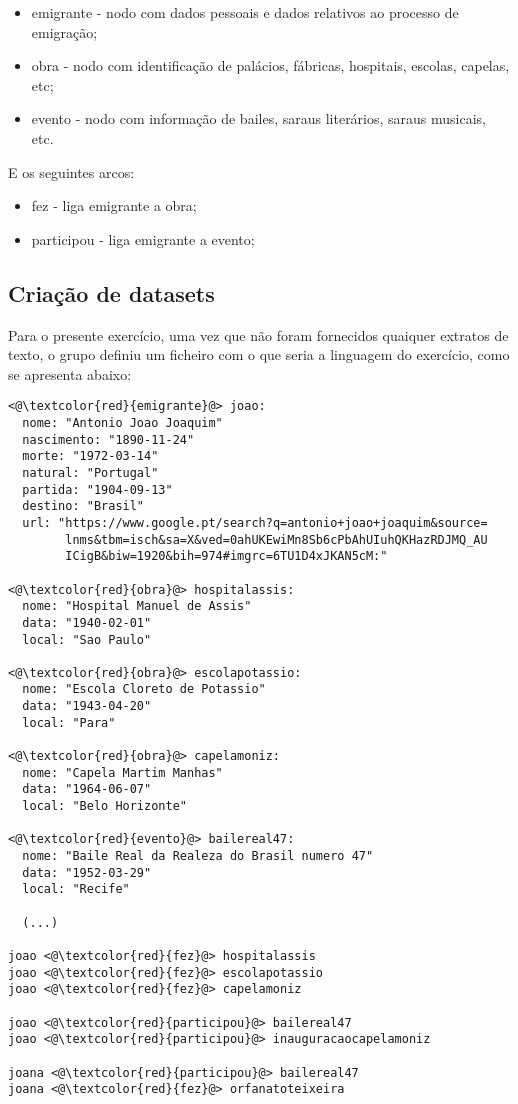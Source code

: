\documentclass[a4paper]{article}
\begin{document}
\begin{itemize}
    \item emigrante - nodo com dados pessoais e dados relativos ao
processo de emigração;
    \item obra - nodo com identificação de palácios, fábricas, hospitais, escolas, capelas, etc;
    \item evento - nodo com informação de bailes, saraus literários, saraus musicais, etc.
\end{itemize}

\bigskip
E os seguintes arcos:

\begin{itemize}
    \item fez - liga emigrante a obra;
    \item participou - liga emigrante a evento;
\end{itemize}

\pagebreak
\subsection{Criação de datasets}
\label{sec:3.1}
\hspace{3.5mm} Para o presente exercício, uma vez que não foram fornecidos quaiquer extratos de texto, o grupo definiu um ficheiro com o que seria a linguagem do exercício, como se apresenta abaixo:

\bigskip

\begin{lstlisting}
<@\textcolor{red}{emigrante}@> joao:
  nome: "Antonio Joao Joaquim"
  nascimento: "1890-11-24"
  morte: "1972-03-14"
  natural: "Portugal"
  partida: "1904-09-13"
  destino: "Brasil"
  url: "https://www.google.pt/search?q=antonio+joao+joaquim&source=
        lnms&tbm=isch&sa=X&ved=0ahUKEwiMn8Sb6cPbAhUIuhQKHazRDJMQ_AU
        ICigB&biw=1920&bih=974#imgrc=6TU1D4xJKAN5cM:"

<@\textcolor{red}{obra}@> hospitalassis:
  nome: "Hospital Manuel de Assis"
  data: "1940-02-01"
  local: "Sao Paulo"

<@\textcolor{red}{obra}@> escolapotassio:
  nome: "Escola Cloreto de Potassio"
  data: "1943-04-20"
  local: "Para"

<@\textcolor{red}{obra}@> capelamoniz:
  nome: "Capela Martim Manhas"
  data: "1964-06-07"
  local: "Belo Horizonte"

<@\textcolor{red}{evento}@> bailereal47:
  nome: "Baile Real da Realeza do Brasil numero 47"
  data: "1952-03-29"
  local: "Recife"
  
  (...)

joao <@\textcolor{red}{fez}@> hospitalassis
joao <@\textcolor{red}{fez}@> escolapotassio
joao <@\textcolor{red}{fez}@> capelamoniz

joao <@\textcolor{red}{participou}@> bailereal47
joao <@\textcolor{red}{participou}@> inauguracaocapelamoniz

joana <@\textcolor{red}{participou}@> bailereal47
joana <@\textcolor{red}{fez}@> orfanatoteixeira
\end{lstlisting}
\end{document}
